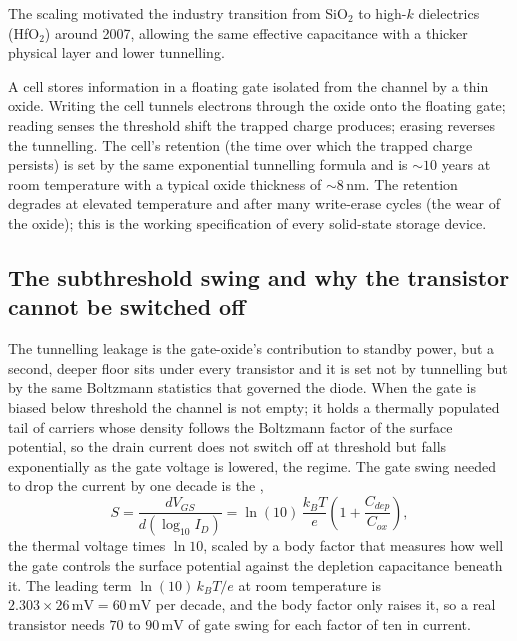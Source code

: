 

 The scaling motivated the industry
transition from SiO$_{2}$ to high-$k$ dielectrics (HfO$_{2}$) around
2007, allowing the same effective capacitance with a thicker
physical layer and lower tunnelling.

A  cell stores information in a floating gate
isolated from the channel by a thin oxide. Writing the cell tunnels
electrons through the oxide onto the floating gate; reading senses
the threshold shift the trapped charge produces; erasing reverses
the tunnelling. The cell's retention (the time over which the
trapped charge persists) is set by the same exponential tunnelling
formula and is $\sim 10$ years at room temperature with a typical
oxide thickness of $\sim 8\,\si{\nano\meter}$. The retention
degrades at elevated temperature and after many write-erase cycles
(the wear of the oxide); this is the working specification of every
solid-state storage device.

\subsection{The subthreshold swing and why the transistor cannot be
switched off}

The tunnelling leakage is the gate-oxide's contribution to standby power,
but a second, deeper floor sits under every transistor and it is set not by
tunnelling but by the same Boltzmann statistics that governed the diode.
When the gate is biased below threshold the channel is not empty; it holds a
thermally populated tail of carriers whose density follows the Boltzmann
factor of the surface potential, so the drain current does not switch off at
threshold but falls exponentially as the gate voltage is lowered, the
 regime. The gate swing needed to drop the current by
one decade is the ,
\[
S = \frac{dV_{GS}}{d(\log_{10} I_D)}
  = \ln(10)\,\frac{k_BT}{e}\left(1 + \frac{C_{dep}}{C_{ox}}\right),
\]
the thermal voltage times $\ln 10$, scaled by a body factor that measures
how well the gate controls the surface potential against the depletion
capacitance beneath it. The leading term $\ln(10)\,k_BT/e$ at room
temperature is $2.303\times 26\,\si{\milli\volt} = 60\,\si{\milli\volt}$ per
decade, and the body factor only raises it, so a real transistor needs
$70$ to $90\,\si{\milli\volt}$ of gate swing for each factor of ten in
current.

